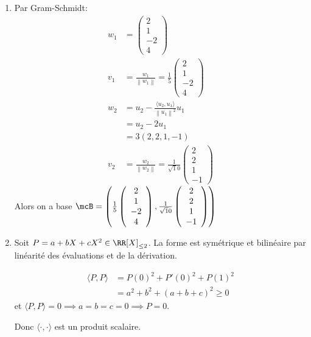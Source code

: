 \documentclass[12pt, a4paper]{article}
\newcommand{\norm}[1]{\left\lVert #1\right\rVert}
\begin{document}
\begin{enumerate}
  \item Par Gram-Schmidt:
    \begin{align*}
      w_1 &= \left(\begin{array}{c} 2\\1\\-2\\4\end{array} \right)\\
      v_1 &= \frac{w_1}{\norm{w_1}} = \frac{1}{5} \left(\begin{array}{c} 2\\1\\-2\\4\end{array}\right)\\
      w_2 &= u_2 - \frac{\langle u_2, u_1 \rangle}{\norm{u_1}^2} u_1 \\
          &= u_2 - 2u_1\\
          &= 3(2, 2, 1, -1)\\
      v_2 &= \frac{w_2}{\norm{w_2}} = \frac{1}{\sqrt 10} \left(\begin{array}{c} 2\\2\\1\\-1\end{array}\right)
    \end{align*}
    Alors on a base $\mcB = \left(  \frac{1}{5}\left(\begin{array}{c} 2\\1\\-2\\4\end{array}\right), \frac{1}{\sqrt 10}\left( \begin{array}{c} 2\\2\\1\\-1\end{array}\right) \right)$

  \item Soit $P=a+bX+cX^2 \in \RR[X]_{\le 2}$.
    La forme est symétrique et bilinéaire par linéarité
    des évaluations et de la dérivation.

    \begin{align*}
      \langle P,P\rangle
      &=P(0)^2+P'(0)^2+P(1)^2\\
      &=a^2+b^2+(a+b+c)^2\ge 0
    \end{align*}
    et $\langle P,P\rangle=0 \implies a=b=c=0
    \implies P=0$.

    Donc $\langle\cdot,\cdot\rangle$ est un produit scalaire.


\end{enumerate}
\end{document}
